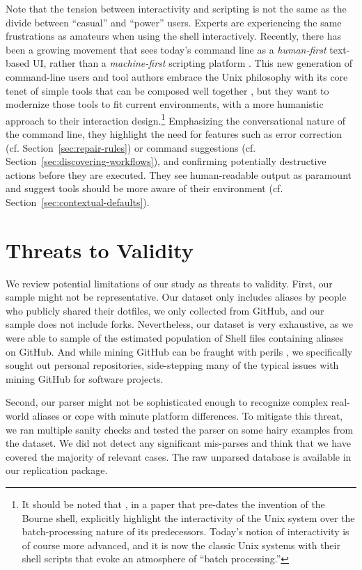 \documentclass[sigconf,nonacm,screen]{acmart}
\newcommand{\per}[1]{\numprint[\%]{#1}}
\begin{document}
Note that the tension between interactivity and scripting is not the same as the divide between ``casual'' and ``power'' users.
Experts are experiencing the same frustrations as amateurs when using the shell interactively.
Recently, there has been a growing movement that sees today's command line as a \emph{human-first} text-based UI, rather than a \emph{machine-first} scripting platform \citep{clig}.
This new generation of command-line users and tool authors embrace the Unix philosophy with its core tenet of simple tools that can be composed well together \citep{raymond:03}, but they want to modernize those tools to fit current environments, with a more humanistic approach to their interaction design.\footnote{It should be noted that \citet{ritchie:74}, in a paper that pre-dates the invention of the Bourne shell, explicitly highlight the interactivity of the Unix system over the batch-processing nature of its predecessors. Today's notion of interactivity is of course more advanced, and it is now the classic Unix systems with their shell scripts that evoke an atmosphere of ``batch processing.''}
Emphasizing the conversational nature of the command line, they highlight the need for features such as error correction (cf. Section~\ref{sec:repair-rules}) or command suggestions (cf. Section~\ref{sec:discovering-workflows}), and confirming potentially destructive actions before they are executed.
They see human-readable output as paramount and suggest tools should be more aware of their environment (cf. Section~\ref{sec:contextual-defaults}).

\section{Threats to Validity}

We review potential limitations of our study as threats to validity.
First, our sample might not be representative.
Our dataset only includes aliases by people who publicly shared their dotfiles, we only collected from GitHub, and our sample does not include forks.
Nevertheless, our dataset is very exhaustive, as we were able to sample \per{94.09} of the estimated population of Shell files containing aliases on GitHub.
And while mining GitHub can be fraught with perils \citep{kalliamvakou:14}, we specifically sought out personal repositories, side-stepping many of the typical issues with mining GitHub for software projects.

Second, our parser might not be sophisticated enough to recognize complex real-world aliases or cope with minute platform differences.
To mitigate this threat, we ran multiple sanity checks and tested the parser on some hairy examples from the dataset.
We did not detect any significant mis-parses and think that we have covered the majority of relevant cases.
The raw unparsed database is available in our replication package.
\end{document}
